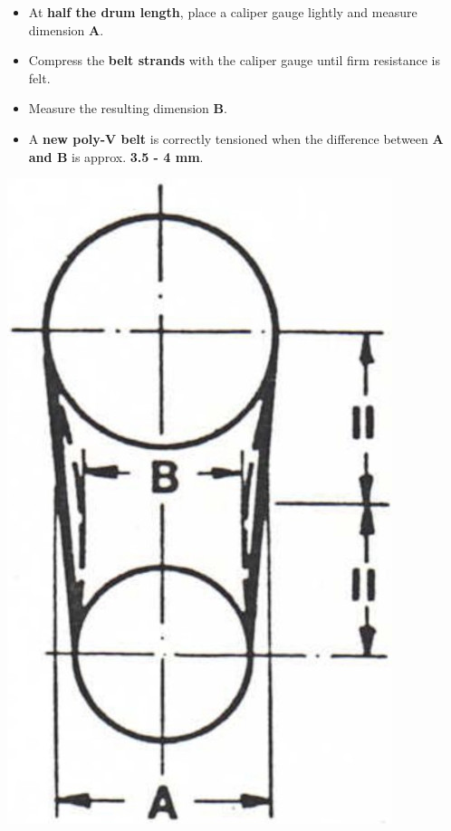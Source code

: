 \begin{minipage}{0.65\textwidth}
\begin{itemize}
    \item At \textbf{half the drum length}, place a caliper gauge lightly and measure dimension \textbf{A}.
    \item Compress the \textbf{belt strands} with the caliper gauge until firm resistance is felt.
    \item Measure the resulting dimension \textbf{B}.
    \item A \textbf{new poly-V belt} is correctly tensioned when the difference between \textbf{A and B} is approx. \textbf{3.5 - 4 mm}\footnotemark[1].
\end{itemize}
\end{minipage}
\hfill
\begin{minipage}{0.3\textwidth}
    \centering
    \includegraphics[width=\textwidth]{images/chapter7/poly_v_belt_tension_diagram.jpg}
\end{minipage}

